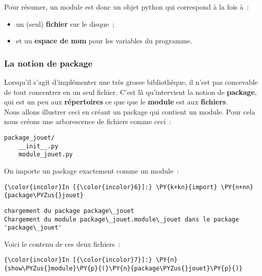     Pour résumer, un module est donc un objet python qui correspond à la
fois à~:

\begin{itemize}
	\item 
	un (seul) \textbf{fichier} sur le disque~;
	\item
	et un \textbf{espace de nom} pour les variables du programme.
\end{itemize}

    \hypertarget{la-notion-de-package}{%
\subsubsection{La notion de package}\label{la-notion-de-package}}

    Lorsqu'il s'agit d'implémenter une très grosse bibliothèque, il n'est
pas concevable de tout concentrer en un seul fichier. C'est là
qu'intervient la notion de \textbf{package}, qui est un peu aux
\textbf{répertoires} ce que que le \textbf{module} est aux
\textbf{fichiers}.\\

    Nous allons illustrer ceci en créant un package qui contient un module.
Pour cela nous créons une arborescence de fichiers comme ceci~:

\begin{verbatim}
package_jouet/
    __init__.py
    module_jouet.py
\end{verbatim}

    On importe un package exactement comme un module~:

    \begin{Verbatim}[commandchars=\\\{\}]
{\color{incolor}In [{\color{incolor}6}]:} \PY{k+kn}{import} \PY{n+nn}{package\PYZus{}jouet}
\end{Verbatim}


    \begin{Verbatim}[commandchars=\\\{\}]
chargement du package package\_jouet
Chargement du module package\_jouet.module\_jouet dans le package 'package\_jouet'

    \end{Verbatim}

    Voici le contenu de ces deux fichiers~:

    \begin{Verbatim}[commandchars=\\\{\}]
{\color{incolor}In [{\color{incolor}7}]:} \PY{n}{show\PYZus{}module}\PY{p}{(}\PY{n}{package\PYZus{}jouet}\PY{p}{)}
\end{Verbatim}


